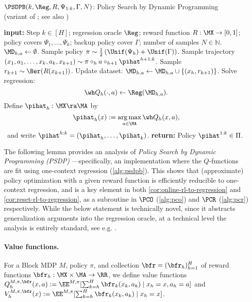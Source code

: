 \begin{algorithm}[tp]
	\caption{$\PSDPB(k, \Reg, R, \Psi_{1:k}, \Gamma, N)$: Policy Search by Dynamic Programming \\(variant of \citet{bagnell2003policy}; see also \cite{mhammedi2023representation,golowich2024exploring})}
	\label{alg:psdpb}
	\begin{algorithmic}[1]\onehalfspacing
          \State \textbf{input:} Step $k \in [H]$; regression oracle $\Reg$; reward function $R: \MX \to [0,1]$; policy covers $\Psi_1, \ldots, \Psi_{k}$; backup policy cover $\Gamma$; number of samples $N\in \mathbb{N}$.
    		\State $\MD_{h,a} \gets\emptyset$.
            \State Sample policy $\pi \sim \frac{1}{2}\left(\Unif(\Psi_h) + \Unif(\Gamma)\right)$.
    		\State Sample trajectory $(x_1, a_1, \dots, x_k, a_k, x_{k+1})\sim
    		\pi \circ_h a \circ_{h+1} \pihat^{h+1:k}$.
            \State Sample $r_{k+1} \sim \Ber(R(x_{k+1}))$.
    		\State Update dataset: $\MD_{h,a} \gets \MD_{h,a} \cup \{ (x_h, r_{k+1})\}$.
    		\EndFor
    		\State Solve regression:
		\[\wh Q_h(\cdot,a) \gets \Reg(\MD_{h,a}).\] \label{eq:psdpb-regression}
        \EndFor
		\State Define $\pihat_h : \MX \ra \MA$ by
		\[
		\pihat_h(x)  := 
			\argmax_{a\in \MA} \wh Q_h(x,a),
          \] 
          \quad\, and write $\pihat^{h:k} = (\pihat_h, \ldots, \pihat_k)$. \label{line:psdpb-pihat-def}
		\EndFor
		\State \textbf{return:} Policy $\pihat^{1:k} \in \Pi$. 
	\end{algorithmic}
\end{algorithm}

The following lemma provides an analysis of \emph{Policy Search by Dynamic Programming (PSDP)} \citep{bagnell2003policy}---specifically, an implementation where the $Q$-functions are fit using one-context regression (\cref{alg:psdpb}). This shows that (approximate) policy optimization with a given reward function is efficiently reducible to one-context regression, and is a key element in both \cref{cor:online-rl-to-regression} and \cref{cor:reset-rl-to-regression}, as a subroutine in $\PCO$ (\cref{alg:pco}) and $\PCR$ (\cref{alg:pcr}) respectively. While the below statement is technically novel, since it abstracts generalization arguments into the regression oracle, at a technical level the analysis is entirely standard, see e.g. \cite{mhammedi2023representation,golowich2024exploring}.

\paragraph{Value functions.} For a Block MDP $M$, policy $\pi$, and collection $\bfr = (\bfr_h)_{h=1}^H$ of reward functions $\bfr_h: \MX \times \MA \to \RR$, we define value functions $Q^{M,\pi,\bfr}_h(x,a) := \EE^{M,\pi}[\sum_{k=h}^H \bfr_k(x_k,a_k) \mid{} x_h=x, a_h=a]$ and $V^{M,\pi,\bfr}_h(x) := \EE^{M,\pi}[\sum_{k=h}^H \bfr_k(x_k,a_k) \mid{} x_h=x]$.

